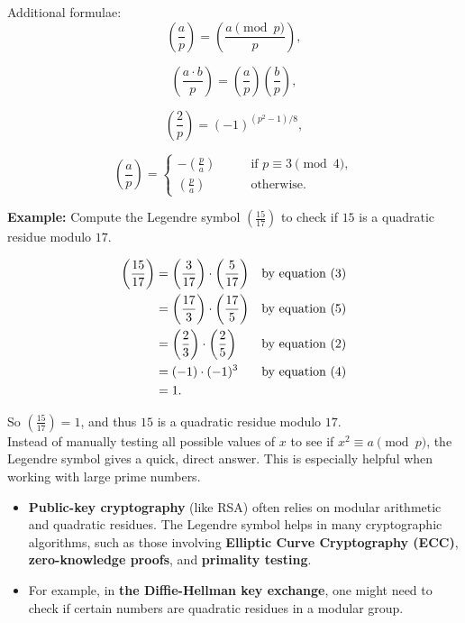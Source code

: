 Additional formulae:    
\begin{equation}
    \left( \frac{a}{p} \right) = \left( \frac{a \pmod{p}}{p} \right),
\end{equation}

\begin{equation}
    \left( \frac{a\cdot b}{p} \right) = \left( \frac{a}{p} \right) \left( \frac{b}{p} \right),
\end{equation}

\begin{equation}
    \left( \frac{2}{p} \right) = (-1)^{(p^2 - 1)\slash8},
\end{equation}

\begin{equation}
    \left( \frac{a}{p} \right) = \begin{cases}
        - \left( \frac{p}{a} \right) & \qquad \text{if } p \equiv 3 \pmod{4}, \\
        \left( \frac{p}{a} \right) & \qquad \text{otherwise}.
        \end{cases}
\end{equation}

\textbf{Example:} Compute the Legendre symbol \( \left( \frac{15}{17} \right) \) to check if \( 15 \) is a quadratic residue modulo \( 17 \).

\begin{align*}
    \left( \frac{15}{17} \right) &= \left( \frac{3}{17} \right) \cdot \left( \frac{5}{17} \right) \hfill &\text{by equation (3)} \\
    &= \left( \frac{17}{3} \right) \cdot \left( \frac{17}{5} \right) \hfill &\text{by equation (5)} \\
    &= \left( \frac{2}{3} \right) \cdot \left( \frac{2}{5} \right) \hfill &\text{by equation (2)} \\
    &= (-1)\cdot (-1)^3 \hfill &\text{by equation (4)} \\
    &= 1.
\end{align*}

So $\left( \frac{15}{17} \right) = 1 $, and thus \( 15 \) is a quadratic residue modulo \( 17 \). \\

Instead of manually testing all possible values of \( x \) to see if \( x^2 \equiv a \pmod{p} \), the Legendre symbol gives a quick, direct answer. This is especially helpful when working with large prime numbers.
\begin{itemize}
    \item \textbf{Public-key cryptography} (like RSA) often relies on modular arithmetic and quadratic residues. The Legendre symbol helps in many cryptographic algorithms, such as those involving \textbf{Elliptic Curve Cryptography (ECC)}, \textbf{zero-knowledge proofs}, and \textbf{primality testing}.
    \item For example, in \textbf{the Diffie-Hellman key exchange}, one might need to check if certain numbers are quadratic residues in a modular group.
\end{itemize}

